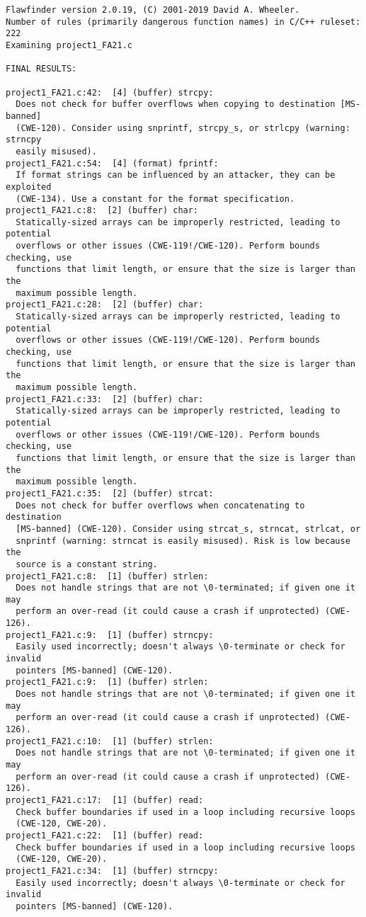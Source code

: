 \documentclass{article}
\begin{document}
\begin{verbatim}
Flawfinder version 2.0.19, (C) 2001-2019 David A. Wheeler.
Number of rules (primarily dangerous function names) in C/C++ ruleset: 222
Examining project1_FA21.c

FINAL RESULTS:

project1_FA21.c:42:  [4] (buffer) strcpy:
  Does not check for buffer overflows when copying to destination [MS-banned]
  (CWE-120). Consider using snprintf, strcpy_s, or strlcpy (warning: strncpy
  easily misused).
project1_FA21.c:54:  [4] (format) fprintf:
  If format strings can be influenced by an attacker, they can be exploited
  (CWE-134). Use a constant for the format specification.
project1_FA21.c:8:  [2] (buffer) char:
  Statically-sized arrays can be improperly restricted, leading to potential
  overflows or other issues (CWE-119!/CWE-120). Perform bounds checking, use
  functions that limit length, or ensure that the size is larger than the
  maximum possible length.
project1_FA21.c:28:  [2] (buffer) char:
  Statically-sized arrays can be improperly restricted, leading to potential
  overflows or other issues (CWE-119!/CWE-120). Perform bounds checking, use
  functions that limit length, or ensure that the size is larger than the
  maximum possible length.
project1_FA21.c:33:  [2] (buffer) char:
  Statically-sized arrays can be improperly restricted, leading to potential
  overflows or other issues (CWE-119!/CWE-120). Perform bounds checking, use
  functions that limit length, or ensure that the size is larger than the
  maximum possible length.
project1_FA21.c:35:  [2] (buffer) strcat:
  Does not check for buffer overflows when concatenating to destination
  [MS-banned] (CWE-120). Consider using strcat_s, strncat, strlcat, or
  snprintf (warning: strncat is easily misused). Risk is low because the
  source is a constant string.
project1_FA21.c:8:  [1] (buffer) strlen:
  Does not handle strings that are not \0-terminated; if given one it may
  perform an over-read (it could cause a crash if unprotected) (CWE-126).
project1_FA21.c:9:  [1] (buffer) strncpy:
  Easily used incorrectly; doesn't always \0-terminate or check for invalid
  pointers [MS-banned] (CWE-120).
project1_FA21.c:9:  [1] (buffer) strlen:
  Does not handle strings that are not \0-terminated; if given one it may
  perform an over-read (it could cause a crash if unprotected) (CWE-126).
project1_FA21.c:10:  [1] (buffer) strlen:
  Does not handle strings that are not \0-terminated; if given one it may
  perform an over-read (it could cause a crash if unprotected) (CWE-126).
project1_FA21.c:17:  [1] (buffer) read:
  Check buffer boundaries if used in a loop including recursive loops
  (CWE-120, CWE-20).
project1_FA21.c:22:  [1] (buffer) read:
  Check buffer boundaries if used in a loop including recursive loops
  (CWE-120, CWE-20).
project1_FA21.c:34:  [1] (buffer) strncpy:
  Easily used incorrectly; doesn't always \0-terminate or check for invalid
  pointers [MS-banned] (CWE-120).


\end{verbatim}
\end{document}
